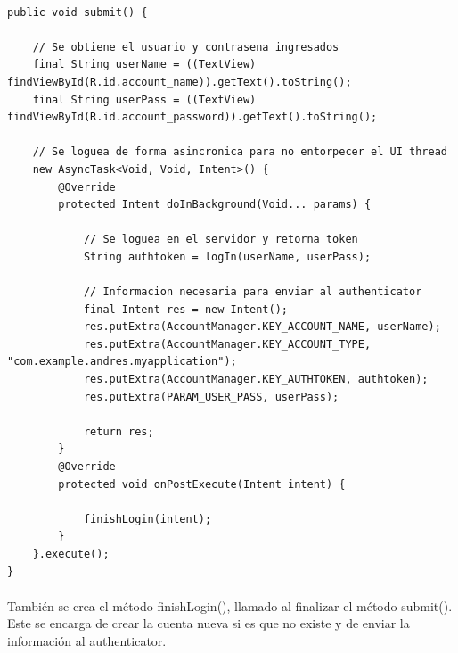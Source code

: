 \documentclass[10pt]{extarticle}
\begin{document}
\begin{lstlisting}

public void submit() {

    // Se obtiene el usuario y contrasena ingresados
    final String userName = ((TextView) findViewById(R.id.account_name)).getText().toString();
    final String userPass = ((TextView) findViewById(R.id.account_password)).getText().toString();

    // Se loguea de forma asincronica para no entorpecer el UI thread
    new AsyncTask<Void, Void, Intent>() {
        @Override
        protected Intent doInBackground(Void... params) {

            // Se loguea en el servidor y retorna token
            String authtoken = logIn(userName, userPass);

            // Informacion necesaria para enviar al authenticator
            final Intent res = new Intent();
            res.putExtra(AccountManager.KEY_ACCOUNT_NAME, userName);
            res.putExtra(AccountManager.KEY_ACCOUNT_TYPE, "com.example.andres.myapplication");
            res.putExtra(AccountManager.KEY_AUTHTOKEN, authtoken);
            res.putExtra(PARAM_USER_PASS, userPass);

            return res;
        }
        @Override
        protected void onPostExecute(Intent intent) {
            
            finishLogin(intent);
        }
    }.execute();
}

\end{lstlisting}

\paragraph{}
También se crea el método finishLogin(), llamado al finalizar el método submit(). Este se encarga de crear la cuenta nueva si es que no existe y de enviar la información al authenticator.
\end{document}
